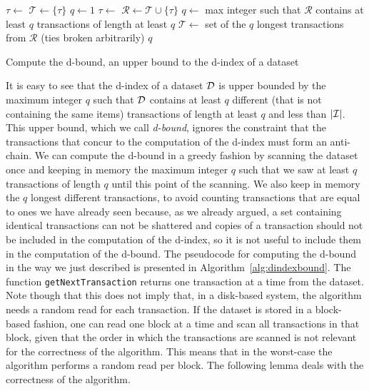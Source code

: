\begin{algorithm}[htb]
  \DontPrintSemicolon
  $\tau\leftarrow$ \GetNextTransaction{$\Ds$}\;
  $\mathcal{T}\leftarrow\{\tau\}$\;
  $q\leftarrow 1$\;
  \While{\ScanIsNotComplete{}} {
  $\tau\leftarrow$ \GetNextTransaction{$\Ds$}\;
   {
  $\mathcal{R}\leftarrow \mathcal{T}\cup\{\tau\}$\;
  $q \leftarrow$ max integer such that $\mathcal{R}$ contains at least $q$ transactions
    of length at least $q$\;
    $\mathcal{T}\leftarrow$ set of the $q$ longest transactions from $\mathcal{R}$ (ties broken
    arbitrarily)\;
  }
  }
  \Return $q$\;
  \caption{Compute the d-bound, an upper bound to the d-index of a
  dataset}\label{alg:dindexbound}
\end{algorithm}

It is easy to see that the d-index of a dataset $\Ds$ is upper bounded by the
maximum integer $q$ such that $\Ds$ contains at least $q$ different (that is not
containing the same items) transactions of length at least $q$ and less than
$|{\cal I}|$. This upper bound, which we call \emph{d-bound}, ignores the constraint
that the transactions that concur to the computation of the d-index must form an
anti-chain. We can compute the d-bound in a greedy fashion by scanning the
dataset %
once and keeping in memory the maximum integer $q$
such that we saw at least $q$ transactions of length $q$ until this point of the
scanning. We also keep in memory the $q$ longest different transactions, to
avoid counting transactions that are equal to ones we have already seen because,
as we already argued, a set containing identical transactions can not be
shattered and copies of a transaction should not be included in the computation
of the d-index, so it is
not useful to include them in the computation of the d-bound. The pseudocode for
computing the d-bound in the way we just described is presented in
Algorithm~\ref{alg:dindexbound}. The function \texttt{getNextTransaction}
returns one transaction at a time from the dataset. Note though that this does
not imply that, in a disk-based system, the algorithm needs a random read for
each transaction. If the dataset is stored in a block-based fashion, one can
read one block at a time and scan all transactions in that block, given that the
order in which the transactions are scanned is not relevant for the correctness
of the algorithm. This means that in the worst-case the algorithm performs a
random read per block.
The following lemma deals with the correctness of the algorithm.


